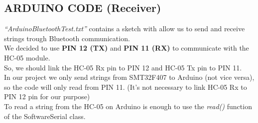 \subsection{ARDUINO CODE (Receiver)}
\textit{“ArduinoBluetoothTest.txt”} contains a sketch with allow us to send and receive strings trough Bluetooth communication.\\
We decided to use \textbf{PIN 12 (TX)} and \textbf{PIN 11 (RX)} to communicate with the HC-05 module.\\
So, we should link the HC-05 Rx pin to PIN 12 and HC-05 Tx pin to PIN 11.\\
In our project we only send strings from SMT32F407 to Arduino (not vice versa), so the code will only read from PIN 11. (It’s not necessary to link HC-05 Rx to PIN 12 pin for our purpose)\\
To read a string from the HC-05 on Arduino is enough to use the \textit{read()} function of the SoftwareSerial class.\\